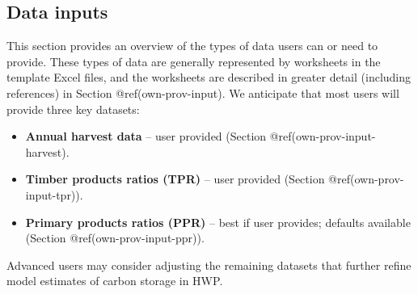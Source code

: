 \documentclass[
  openany]{book}
\providecommand{\tightlist}{%
  \setlength{\itemsep}{0pt}\setlength{\parskip}{0pt}}
\begin{document}
\hypertarget{own-over-inputSum}{%
\subsection{Data inputs}\label{own-over-inputSum}}

This section provides an overview of the types of data users can or need
to provide. These types of data are generally represented by worksheets
in the template Excel files, and the worksheets are described in greater
detail (including references) in Section @ref(own-prov-input). We
anticipate that most users will provide three key datasets:

\begin{itemize}
\tightlist
\item
  \textbf{Annual harvest data} -- user provided (Section
  @ref(own-prov-input-harvest).\\
\item
  \textbf{Timber products ratios (TPR)} -- user provided (Section
  @ref(own-prov-input-tpr)).\\
\item
  \textbf{Primary products ratios (PPR)} -- best if user provides;
  defaults available (Section @ref(own-prov-input-ppr)).
\end{itemize}

Advanced users may consider adjusting the remaining datasets that
further refine model estimates of carbon storage in HWP.
\end{document}
